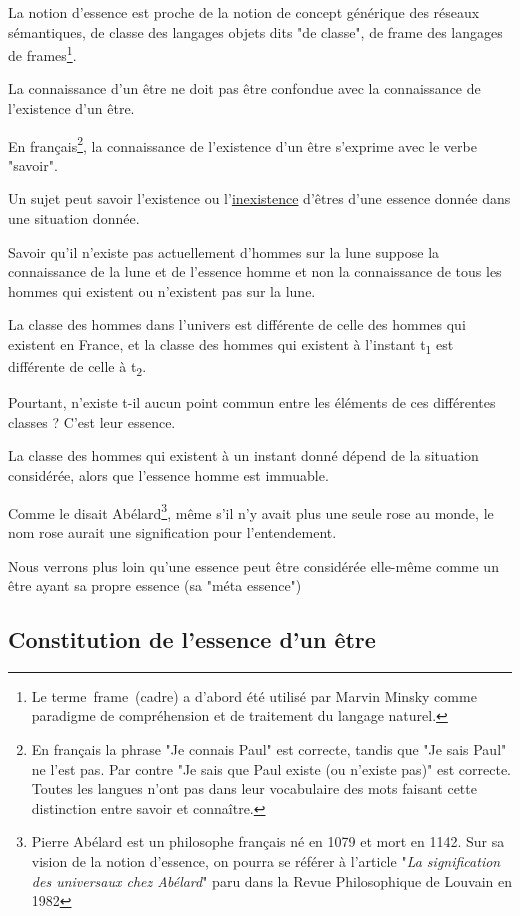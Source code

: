 \documentclass[a4paper, 12pt, openright, french]{book}
\begin{document}
La notion d'essence est proche de la notion de concept
générique des réseaux sémantiques, de classe des langages objets dits
"de classe", de frame des langages de frames\footnote{Le terme~frame~(cadre) a d'abord été utilisé par Marvin
		Minsky comme paradigme de compréhension et de traitement du langage
	naturel.}.

La connaissance d'un être ne doit pas être confondue
avec la connaissance de l'existence d'un
être.

En français\footnote{En français la phrase "Je connais Paul" est
	correcte, tandis que "Je sais Paul" ne l'est pas. Par
	contre "Je sais que Paul existe (ou n'existe pas)" est
	correcte. Toutes les langues n'ont pas dans leur
	vocabulaire des mots faisant cette distinction entre savoir et
	connaître.}, la connaissance de
l'existence d'un être
s'exprime avec le verbe "savoir".

Un sujet peut savoir l'existence ou
l'\uline{inexistence} d'êtres
d'une essence donnée dans une situation donnée.

Savoir qu'il n'existe pas actuellement
d'hommes sur la lune suppose la connaissance de la lune
et de l'essence homme et non la connaissance de tous les
hommes qui existent ou n'existent pas sur la lune.

La classe des hommes dans l'univers est différente de
celle des hommes qui existent en France, et la classe des hommes qui
existent à l'instant t\textsubscript{1} est différente
de celle à t\textsubscript{2}.

Pourtant, n'existe t-il aucun point commun entre les
éléments de ces différentes classes ? C'est leur
essence.

La classe des hommes qui existent à un instant donné dépend de la
situation considérée, alors que l'essence homme est
immuable.

Comme le disait Abélard\footnote{ Pierre Abélard est un philosophe français né en 1079
	et mort en 1142. Sur sa vision de la notion d'essence,
	on pourra se référer à l'article "\emph{La signification
		des universaux chez Abélard}" paru dans
	la Revue Philosophique de
		Louvain en 1982}, même s'il
n'y avait plus une seule rose au monde, le nom rose
aurait une signification pour l'entendement.

Nous verrons plus loin qu'une essence peut être
considérée elle-même comme un être ayant sa propre essence (sa "méta
essence")



\newpage
\subsection{Constitution de l'essence d'un être}
\end{document}
